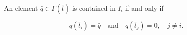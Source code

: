 An element $\bar{q} \in \Gamma(\bar{t})$ is contained in $I_i$ if and only if

$$q(\bar{t}_i) = \bar{q} \quad \text{and} \quad q(\bar{t}_j) = 0, \quad j \neq i.$$
